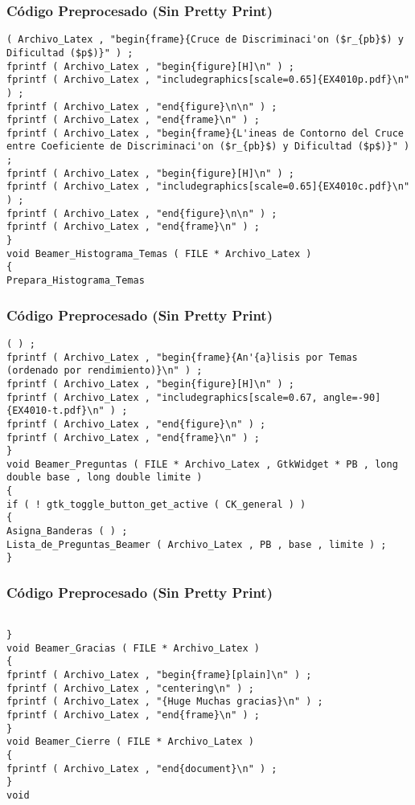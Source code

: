 \documentclass{beamer}
\begin{document}
\begin{frame}[fragile]
\frametitle{C\'odigo Preprocesado (Sin Pretty Print)}
\begin{lstlisting}[style=CStyle]
( Archivo_Latex , "begin{frame}{Cruce de Discriminaci'on ($r_{pb}$) y Dificultad ($p$)}" ) ; 
fprintf ( Archivo_Latex , "begin{figure}[H]\n" ) ; 
fprintf ( Archivo_Latex , "includegraphics[scale=0.65]{EX4010p.pdf}\n" ) ; 
fprintf ( Archivo_Latex , "end{figure}\n\n" ) ; 
fprintf ( Archivo_Latex , "end{frame}\n" ) ; 
fprintf ( Archivo_Latex , "begin{frame}{L'ineas de Contorno del Cruce entre Coeficiente de Discriminaci'on ($r_{pb}$) y Dificultad ($p$)}" ) ; 
fprintf ( Archivo_Latex , "begin{figure}[H]\n" ) ; 
fprintf ( Archivo_Latex , "includegraphics[scale=0.65]{EX4010c.pdf}\n" ) ; 
fprintf ( Archivo_Latex , "end{figure}\n\n" ) ; 
fprintf ( Archivo_Latex , "end{frame}\n" ) ; 
} 
void Beamer_Histograma_Temas ( FILE * Archivo_Latex ) 
{ 
Prepara_Histograma_Temas \end{lstlisting}
\end{frame}
\begin{frame}[fragile]
\frametitle{C\'odigo Preprocesado (Sin Pretty Print)}
\begin{lstlisting}[style=CStyle]
( ) ; 
fprintf ( Archivo_Latex , "begin{frame}{An'{a}lisis por Temas (ordenado por rendimiento)}\n" ) ; 
fprintf ( Archivo_Latex , "begin{figure}[H]\n" ) ; 
fprintf ( Archivo_Latex , "includegraphics[scale=0.67, angle=-90]{EX4010-t.pdf}\n" ) ; 
fprintf ( Archivo_Latex , "end{figure}\n" ) ; 
fprintf ( Archivo_Latex , "end{frame}\n" ) ; 
} 
void Beamer_Preguntas ( FILE * Archivo_Latex , GtkWidget * PB , long double base , long double limite ) 
{ 
if ( ! gtk_toggle_button_get_active ( CK_general ) ) 
{ 
Asigna_Banderas ( ) ; 
Lista_de_Preguntas_Beamer ( Archivo_Latex , PB , base , limite ) ; 
} \end{lstlisting}
\end{frame}
\begin{frame}[fragile]
\frametitle{C\'odigo Preprocesado (Sin Pretty Print)}
\begin{lstlisting}[style=CStyle]

} 
void Beamer_Gracias ( FILE * Archivo_Latex ) 
{ 
fprintf ( Archivo_Latex , "begin{frame}[plain]\n" ) ; 
fprintf ( Archivo_Latex , "centering\n" ) ; 
fprintf ( Archivo_Latex , "{Huge Muchas gracias}\n" ) ; 
fprintf ( Archivo_Latex , "end{frame}\n" ) ; 
} 
void Beamer_Cierre ( FILE * Archivo_Latex ) 
{ 
fprintf ( Archivo_Latex , "end{document}\n" ) ; 
} 
void \end{lstlisting}
\end{frame}
\end{document}
